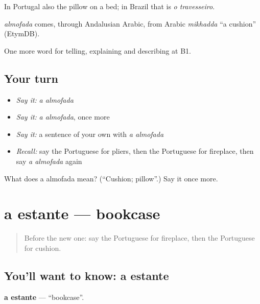 In Portugal also the pillow on a bed; in Brazil that is \emph{o travesseiro}.

\begin{cousinweb}
\emph{almofada} comes, through Andalusian Arabic, from Arabic \emph{mikhadda} \textquotedblleft{}a cushion\textquotedblright{} (EtymDB).
\end{cousinweb}

\begin{grammarlens}[title={What you've built}]
One more word for telling, explaining and describing at B1.
\end{grammarlens}

\subsection*{Your turn}
\begin{itemize}
\raggedright
  \item \emph{Say it:} \emph{a almofada}
  \item \emph{Say it:} \emph{a almofada}, once more
  \item \emph{Say it:} a sentence of your own with \emph{a almofada}
  \item \emph{Recall:} say the Portuguese for pliers, then the Portuguese for fireplace, then say \emph{a almofada} again
\end{itemize}

\begin{tcolorbox}[breakable,colback=teal!4,colframe=teal!35!black,title={Before you move on}]
What does a almofada mean? (\textquotedblleft{}Cushion; pillow\textquotedblright{}.) Say it once more.
\end{tcolorbox}
\section[a estante]{a estante — bookcase}

\label{lesson:PT-C532-estante}



\begin{quote}
Before the new one: say the Portuguese for fireplace, then the Portuguese for cushion.
\end{quote}

\subsection*{You'll want to know: a estante}
\textbf{a estante} — \textquotedblleft{}bookcase\textquotedblright{}.

